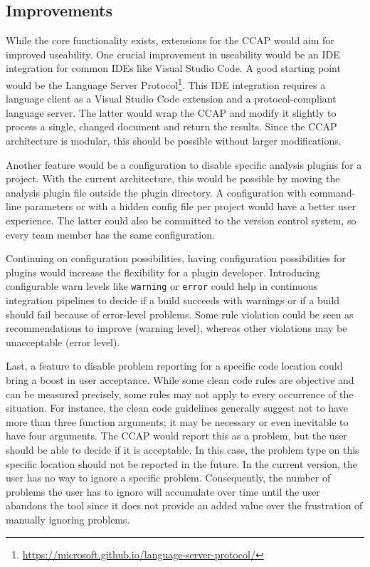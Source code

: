 \subsection{Improvements}
While the core functionality exists, extensions for the CCAP would aim for improved useability. One crucial improvement in useability would be an IDE integration for common IDEs like Visual Studio Code. A good starting point would be the Language Server Protocol\footnote{\url{https://microsoft.github.io/language-server-protocol/}}. This IDE integration requires a language client as a Visual Studio Code extension and a protocol-compliant language server. The latter would wrap the CCAP and modify it slightly to process a single, changed document and return the results. Since the CCAP architecture is modular, this should be possible without larger modifications. 

Another feature would be a configuration to disable specific analysis plugins for a project. With the current architecture, this would be possible by moving the analysis plugin file outside the plugin directory. A configuration with command-line parameters or with a hidden config file per project would have a better user experience. The latter could also be committed to the version control system, so every team member has the same configuration.

Continuing on configuration possibilities, having configuration possibilities for plugins would increase the flexibility for a plugin developer. Introducing configurable warn levels like \texttt{warning} or \texttt{error} could help in continuous integration pipelines to decide if a build succeeds with warnings or if a build should fail because of error-level problems. Some rule violation could be seen as recommendations to improve (warning level), whereas other violations may be unacceptable (error level).

Last, a feature to disable problem reporting for a specific code location could bring a boost in user acceptance. While some clean code rules are objective and can be measured precisely, some rules may not apply to every occurrence of the situation. For instance, the clean code guidelines generally suggest not to have more than three function arguments; it may be necessary or even inevitable to have four arguments. The CCAP would report this as a problem, but the user should be able to decide if it is acceptable. In this case, the problem type on this specific location should not be reported in the future. In the current version, the user has no way to ignore a specific problem. Consequently, the number of problems the user has to ignore will accumulate over time until the user abandons the tool since it does not provide an added value over the frustration of manually ignoring problems.

